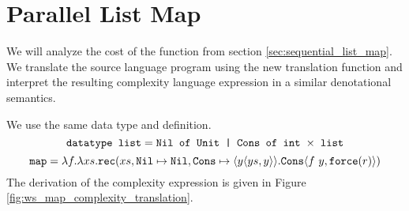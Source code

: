 %
%
\section{Parallel List Map}
We will analyze the cost of the  function from section
\ref{sec:sequential_list_map}. We translate the source language program using
the new translation function and interpret the resulting complexity language
expression in a similar denotational semantics.

We use the same data type  and  definition.
%
\begin{equation*}
  \texttt{datatype list} = \texttt{Nil of Unit | Cons of int $\times$ list}
\end{equation*}
%
\begin{equation*}
  \texttt{map} = \lambda f. \lambda xs . \texttt{rec}(xs, \texttt{Nil} \mapsto \texttt{Nil}, \texttt{Cons} \mapsto \langle y \langle ys, y \rangle\rangle. \texttt{Cons}\langle f\ y, \texttt{force}(r)\rangle)
\end{equation*}
%
The derivation of the complexity expression is given in Figure
\ref{fig:ws_map_complexity_translation}.
%
